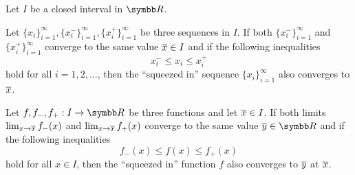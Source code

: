 \begin{lemma}\label{thm:squeeze_lemma}
  Let \( I \) be a closed interval in \( \BR \).

  \begin{thmenum}
     Let \( \{ x_i \}_{i=1}^\infty, \{ x_i^- \}_{i=1}^\infty, \{ x_i^+ \}_{i=1}^\infty \) be three sequences in \( I \). If both \( \{ x_i^- \}_{i=1}^\infty \) and \( \{ x_i^+ \}_{i=1}^\infty \) converge to the same value \( \overline{x} \in I \) and if the following inequalities
    \begin{equation*}
      x_i^- \leq x_i \leq x_i^+
    \end{equation*}
    hold for all \( i = 1, 2, \ldots \), then the \enquote{squeezed in} sequence \( \{ x_i \}_{i=1}^\infty \) also converges to \( \overline{x} \).

     Let \( f, f_-, f_+: I \to \BR \) be three functions and let \( \overline{x} \in I \). If both limits \( \lim_{x \to \overline{x}} f_-(x) \) and \( \lim_{x \to \overline{x}} f_+(x) \) converge to the same value \( \Ol y \in \BR \) and if the following inequalities
    \begin{equation*}
      f_-(x) \leq f(x) \leq f_+(x)
    \end{equation*}
    hold for all \( x \in I \), then the \enquote{squeezed in} function \( f \) also converges to \( \overline{y} \) at \( \overline{x} \).
  \end{thmenum}
\end{lemma}
